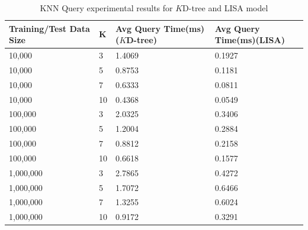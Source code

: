 \begin{table}
	\centering
\centering
	\begin{tabular}{||p{}<{\centering}|p{}<{\centering}|p{}<{\centering}|p{}<{\centering}||}
		\hline
		Training/Test Data Size& K & Avg Query Time(ms)($K$D-tree) & Avg Query Time(ms)(LISA)\\ [0.5ex] 
		\hline
		\hline
	 	10,000& 3& 1.4069 &0.1927 \\
	 	\hline
	 	10,000& 5& 0.8753 &0.1181\\
	 	\hline
	 	10,000& 7& 0.6333 &0.0811 \\
	 	\hline
	 	10,000 & 10& 0.4368 &0.0549 \\
	 	\hline
	 	100,000 & 3& 2.0325 &0.3406 \\
	 	\hline
	 	100,000 & 5& 1.2004 &0.2884 \\
	 	\hline
	 	100,000 & 7& 0.8812 &0.2158 \\
	 	\hline
	 	100,000 & 10&  0.6618 &0.1577 \\
	 	\hline
	    1,000,000 & 3& 2.7865 & 0.4272 \\
	 	\hline
	 	1,000,000 & 5& 1.7072 &0.6466 \\
	 	\hline
	 	1,000,000 & 7& 1.3255 &0.6024 \\
	 	\hline
	 	1,000,000 & 10& 0.9172 &0.3291 \\
		\hline
		\hline
	\end{tabular}
	\caption{KNN Query experimental results for $K$D-tree and LISA model}
	\label{KNN_Query_Experimental_Results}

\end{table}
